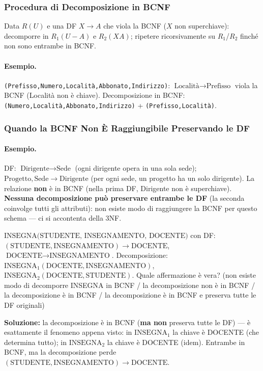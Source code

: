 \documentclass[12pt, a4paper]{article}
\begin{document}
\subsubsection{Procedura di Decomposizione in BCNF}
Data $R(U)$ e una DF $X \to A$ che viola la BCNF ($X$ non superchiave): decomporre in $R_1(U-A)$ e $R_2(XA)$; ripetere ricorsivamente su $R_1$/$R_2$ finché non sono entrambe in BCNF.

\paragraph{Esempio.} \texttt{(Prefisso,Numero,Località,Abbonato,Indirizzo)}: $\text{Località}\to\text{Prefisso}$ viola la BCNF (Località non è chiave). Decomposizione in BCNF: \texttt{(Numero,Località,Abbonato,Indirizzo)} + \texttt{(Prefisso,Località)}.

\subsubsection{Quando la BCNF Non È Raggiungibile Preservando le DF}
\paragraph{Esempio.} DF: $\text{Dirigente} \to \text{Sede}$ (ogni dirigente opera in una sola sede); $\text{Progetto},\text{Sede} \to \text{Dirigente}$ (per ogni sede, un progetto ha un solo dirigente). La relazione \textbf{non} è in BCNF (nella prima DF, Dirigente non è superchiave). \textbf{Nessuna decomposizione può preservare entrambe le DF} (la seconda coinvolge tutti gli attributi): non esiste modo di raggiungere la BCNF per questo schema — ci si accontenta della 3NF.

\begin{tcolorbox}[colback=lightergray!10, colframe=tocsec, title=\textbf{Esercizio 2}]
$\text{INSEGNA(STUDENTE, INSEGNAMENTO, DOCENTE)}$ con DF: $(\text{STUDENTE},\text{INSEGNAMENTO})\to\text{DOCENTE}$, $\text{DOCENTE}\to\text{INSEGNAMENTO}$. Decomposizione: $\text{INSEGNA}_1(\text{DOCENTE},\text{INSEGNAMENTO})$, $\text{INSEGNA}_2(\text{DOCENTE},\text{STUDENTE})$. Quale affermazione è vera? (non esiste modo di decomporre INSEGNA in BCNF / la decomposizione non è in BCNF / la decomposizione è in BCNF / la decomposizione è in BCNF e preserva tutte le DF originali)
\end{tcolorbox}
\textbf{Soluzione:} la decomposizione è in BCNF (\textbf{ma non} preserva tutte le DF) — è esattamente il fenomeno appena visto: in $\text{INSEGNA}_1$ la chiave è DOCENTE (che determina tutto); in $\text{INSEGNA}_2$ la chiave è DOCENTE (idem). Entrambe in BCNF, ma la decomposizione perde $(\text{STUDENTE},\text{INSEGNAMENTO})\to\text{DOCENTE}$.
\end{document}

